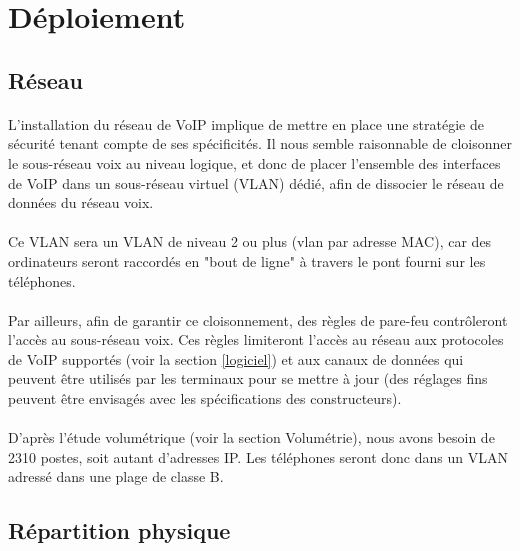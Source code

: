 \section{Déploiement}

\subsection{Réseau}

\paragraph{} L'installation du réseau de VoIP implique de mettre en place une
stratégie de sécurité tenant compte de ses spécificités. Il nous semble
raisonnable de cloisonner le sous-réseau voix au niveau logique, et donc de
placer l'ensemble des interfaces de VoIP dans un sous-réseau virtuel (VLAN)
dédié, afin de dissocier le réseau de données du réseau voix.

\paragraph{} Ce VLAN sera un VLAN de niveau 2 ou plus (vlan par adresse MAC),
car des ordinateurs seront raccordés en "bout de ligne" à travers le pont fourni
sur les téléphones.

\paragraph{} Par ailleurs, afin de garantir ce cloisonnement, des règles de
pare-feu contrôleront l'accès au sous-réseau voix. Ces règles limiteront
l'accès au réseau aux protocoles de VoIP supportés (voir la section
\ref{logiciel}) et aux canaux de données qui peuvent être utilisés par les
terminaux pour se mettre à jour (des réglages fins peuvent être envisagés avec
les spécifications des constructeurs).

\paragraph{} D'après l'étude volumétrique (voir la section Volumétrie), nous avons
besoin de 2310 postes, soit autant d'adresses IP. Les téléphones seront donc
dans un VLAN adressé dans une plage de classe B.

\subsection{Répartition physique}

